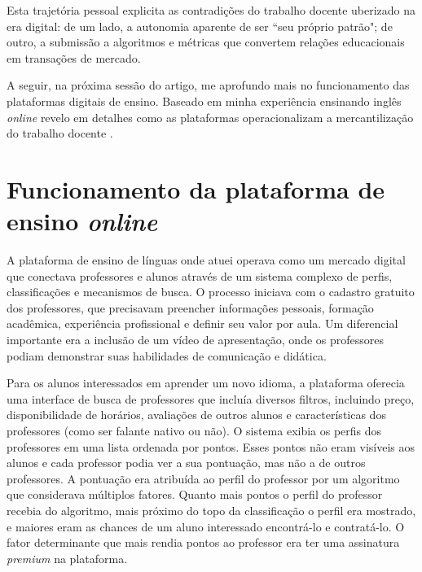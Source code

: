 \documentclass[portuguese]{textolivre}
\begin{document}
Esta trajetória pessoal explicita as contradições do trabalho docente uberizado na era digital: de um lado, a autonomia aparente de ser ``seu próprio patrão"; de outro, a submissão a algoritmos e métricas que convertem relações educacionais em transações de mercado.

A seguir, na próxima sessão do artigo, me aprofundo mais no funcionamento das plataformas digitais de ensino. Baseado em minha experiência ensinando inglês \textit{online} revelo em detalhes como as plataformas operacionalizam a mercantilização do trabalho docente \cite{antunes2020, standing2014}.

\section{Funcionamento da plataforma de ensino \textit{online}}
A plataforma de ensino de línguas onde atuei operava como um mercado digital que conectava professores e alunos através de um sistema complexo de perfis, classificações e mecanismos de busca. O processo iniciava com o cadastro gratuito dos professores, que precisavam preencher informações pessoais, formação acadêmica, experiência profissional e definir seu valor por aula. Um diferencial importante era a inclusão de um vídeo de apresentação, onde os professores podiam demonstrar suas habilidades de comunicação e didática.

Para os alunos interessados em aprender um novo idioma, a plataforma oferecia uma interface de busca de professores que incluía diversos filtros, incluindo preço, disponibilidade de horários, avaliações de outros alunos e características dos professores (como ser falante nativo ou não). O sistema exibia os perfis dos professores em uma lista ordenada por pontos. Esses pontos não eram visíveis aos alunos e cada professor podia ver a sua pontuação, mas não a de outros professores. A pontuação era atribuída ao perfil do professor por um algoritmo que considerava múltiplos fatores. Quanto mais pontos o perfil do professor recebia do algoritmo, mais próximo do topo da classificação o perfil era mostrado, e maiores eram as chances de um aluno interessado encontrá-lo e contratá-lo. O fator determinante que mais rendia pontos ao professor era ter uma assinatura \textit{premium} na plataforma.
\end{document}
